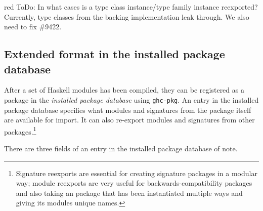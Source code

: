 \documentclass{article}
\begin{document}
\begin{color}{red}
ToDo: In what cases is a type class instance/type family instance reexported?
Currently, type classes from the backing implementation leak through.
We also need to fix \#9422.
\end{color}

\subsection{Extended format in the installed package database}\label{sec:pkgdb}

After a set of Haskell modules has been compiled, they can be registered
as a package in the \emph{installed package database} using
\texttt{ghc-pkg}.  An entry in the installed package database specifies
what modules and signatures from the package itself are available for
import. It can also re-export modules and signatures from other
packages.\footnote{Signature reexports are essential for creating
signature packages in a modular way; module reexports are very useful
for backwards-compatibility packages and also taking an package that has
been instantiated multiple ways and giving its modules unique names.}

There are three fields of an entry in the installed package database of note.
\end{document}
